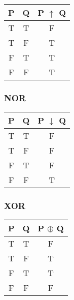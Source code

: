 \begin{multicols}{2}
\begin{table}[H]
\centering
\begin{tabular}[t]{|c|c|c|}
\hline
\textbf{P} & \textbf{Q} & \textbf{P $\uparrow$ Q} \\ \hline
T & T & F \\ \hline
T & F & T \\ \hline
F & T & T \\ \hline
F & F & T \\ \hline
\end{tabular}
\end{table}

\subsubsection{NOR}

\begin{table}[H]
\centering
\begin{tabular}[t]{|c|c|c|}
\hline
\textbf{P} & \textbf{Q} & \textbf{P $\downarrow$ Q} \\ \hline
T & T & F \\ \hline
T & F & F \\ \hline
F & T & F \\ \hline
F & F & T \\ \hline
\end{tabular}
\end{table}

\subsubsection{XOR}

\begin{table}[H]
\centering
\begin{tabular}[t]{|c|c|c|}
\hline
\textbf{P} & \textbf{Q} & \textbf{P $\oplus$ Q} \\ \hline
T & T & F \\ \hline
T & F & T \\ \hline
F & T & T \\ \hline
F & F & F \\ \hline
\end{tabular}
\end{table}

\end{multicols}
